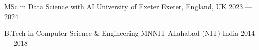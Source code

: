 
\begin{cventries}

  \cventry
    {MSc in Data Science with AI}
    {University of Exeter}
    {Exeter, England, UK}
    {2023 --- 2024}
    {}

  \cventry
    {B.Tech in Computer Science \& Engineering}
    {MNNIT Allahabad (NIT)}
    {India}
    {2014 --- 2018}
    {}

\end{cventries}